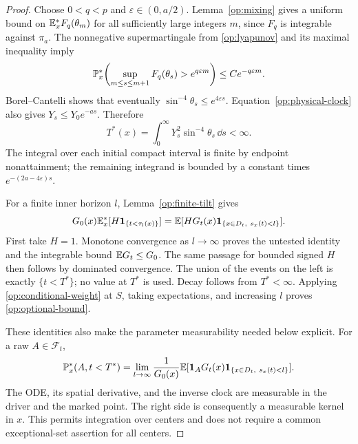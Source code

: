 \begin{proof}
Choose $0<q<p$ and $\varepsilon\in(0,a/2)$. Lemma~\ref{op:mixing}
gives a uniform bound on $\mathbb E_x^*F_q(\theta_m)$ for all sufficiently
large integers $m$, since $F_q$ is integrable against $\pi_a$.
The nonnegative supermartingale from \eqref{op:lyapunov} and its
maximal inequality imply
\[
 \mathbb P_x^*\!\left(\sup_{m\le s\le m+1}F_q(\theta_s)
                      >e^{q\varepsilon m}\right)
 \le C e^{-q\varepsilon m}.
\]
Borel--Cantelli shows that eventually
$\sin^{-4}\theta_s\le e^{4\varepsilon s}$.
Equation~\eqref{op:physical-clock} also gives $Y_s\le Y_0e^{-as}$.
Therefore
\[
 T^*(x)=\int_0^\infty Y_s^2\sin^{-4}\theta_s\,\dd s<\infty.
\]
The integral over each initial compact interval is finite by endpoint
nonattainment; the remaining integrand is bounded by a constant times
$e^{-(2a-4\varepsilon)s}$.

For a finite inner horizon $l$, Lemma~\ref{op:finite-tilt} gives
\[
 G_0(x)\mathbb E_x^*[H\mathbf 1_{\{t<\tau_l(x)\}}]
 =\mathbb E[H G_t(x)\mathbf 1_{\{x\in D_t,\ s_x(t)<l\}}].
\]
First take $H=1$. Monotone convergence as $l\to\infty$ proves the
untested identity and the integrable bound $\mathbb E G_t\le G_0$.
The same passage for bounded signed $H$ then follows by dominated
convergence. The union of the events on the left is exactly
$\{t<T^*\}$; no value at $T^*$ is used. Decay follows from
$T^*<\infty$. Applying \eqref{op:conditional-weight} at $S$, taking
expectations, and increasing $l$ proves \eqref{op:optional-bound}.

These identities also make the parameter measurability needed below
explicit. For a raw $A\in\mathcal F_t$,
\[
 \mathbb P_x^*(A,t<T^*)
 =\lim_{l\to\infty}\frac1{G_0(x)}
   \mathbb E[\mathbf 1_A G_t(x)
                 \mathbf 1_{\{x\in D_t,\ s_x(t)<l\}}].
\]
The ODE, its spatial derivative, and the inverse clock are measurable
in the driver and the marked point. The right side is consequently a
measurable kernel in $x$. This permits integration over centers and
does not require a common exceptional-set assertion for all centers.
\end{proof}
